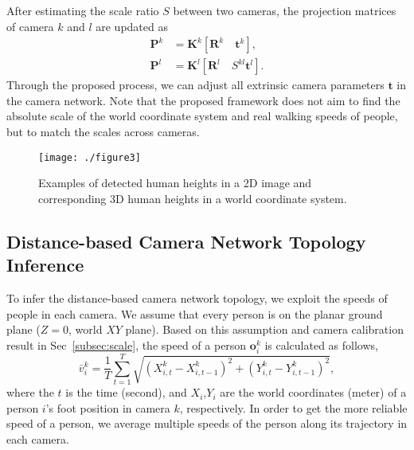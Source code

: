 \documentclass[10pt,twocolumn,letterpaper]{article}
\begin{document}
	After estimating the scale ratio $S$ between two cameras, the projection matrices of camera $k$ and $l$ are updated as	
	\begin{equation}
	\begin{split}
	\mathbf{P}^k & = \mathbf{K}^k\left[ \mathbf{R}^k\quad \mathbf{t}^k \right], \\
	\mathbf{P}^l & = \mathbf{K}^l\left[ \mathbf{R}^l\quad S^{kl}\mathbf{t}^l \right].
	\end{split}
	\end{equation}
	Through the proposed process, we can adjust all extrinsic camera parameters $\mathbf{t}$ in the camera network.
	Note that the proposed framework does not aim to find the absolute scale of the world coordinate system and real walking speeds of people, but to match the scales across cameras.
	
	\begin{figure}[t]	
		\centering
		\texttt{[image: ./figure3]}
		\caption{Examples of detected human heights in a 2D image and corresponding 3D human heights in a world coordinate system.}
		\label{fig_3}
			\vspace{-10pt}
	\end{figure}
	
	
	\subsection{Distance-based Camera Network Topology Inference}
	\label{subsec:dist_top}
	
	To infer the distance-based camera network topology, we exploit the speeds of people in each camera.  
	We assume that every person is on the planar ground plane ($Z=0$, world $XY$ plane).
	Based on this assumption and camera calibration result in Sec~\ref{subsec:scale}, the speed of a person $\mathbf{o}^{k}_{i}$ is calculated as follows,
	\begin{equation}	
	\bar{ v }^{ k }_{  i   }=\frac { 1 }{ T } \sum _{ t=1 }^{ T }{ \sqrt { { \left( { X }^{ k }_{  i, t }-{ X }^{ k }_{ i, t-1 } \right)  }^{ 2 }+{ \left( { Y }^{ k }_{ i, t }-{ Y }^{ k }_{ i, t-1 } \right)  }^{ 2 } }  } ,
	\end{equation}
	where the $t$ is the time (second), and $X_{i}$,$Y_{i}$ are the world coordinates (meter) of a person $i$'s foot position in camera $k$, respectively.
	In order to get the more reliable speed of a person, we average multiple speeds of the person along its trajectory in each camera.
	
\end{document}
